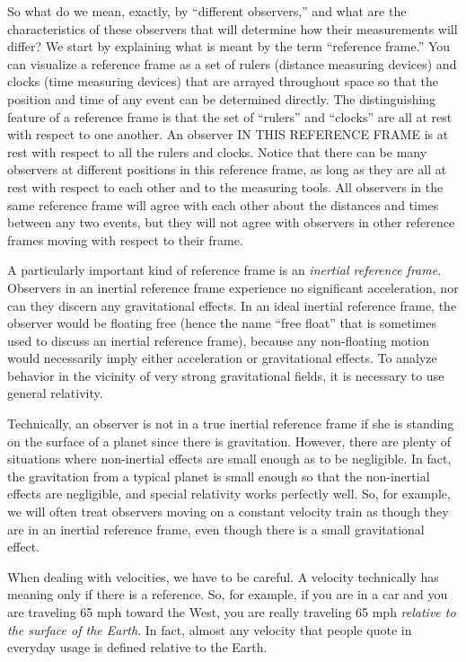    
So what do we mean, exactly, by ``different observers,'' and what
are the characteristics of these observers that will determine how
their measurements will differ?  We start by explaining what is meant
by the term ``reference frame.'' You can visualize a reference frame
as a set of rulers (distance measuring devices) and clocks (time
measuring devices) that are arrayed throughout space so that the
position and time of any event can be determined directly.  The distinguishing
feature of a reference frame is that the set of ``rulers'' and ``clocks''
are all at rest with respect to one another.  An observer IN THIS
REFERENCE FRAME is at rest with respect to all the rulers and clocks.
Notice that there can be many observers at different positions
in this reference frame, as long as they are all at rest with respect
to each other and to the measuring tools. All observers in the same
reference frame will agree with each other about the distances and
times between any two events, but they will not agree with observers
in other reference frames moving with respect to their frame.

A particularly important kind of reference frame is an \emph{inertial reference frame}.  Observers in an inertial reference
frame experience no significant acceleration, nor can they discern any
gravitational effects.  In an ideal inertial reference frame, the
observer would be floating free (hence the name ``free float'' that is
sometimes used to discuss an inertial reference frame), because any
non-floating motion would necessarily imply either acceleration or
gravitational effects.  To analyze behavior in the vicinity of very
strong gravitational fields, it is necessary to use general
relativity.
   
Technically, an observer is not in a true inertial reference frame if
she is standing on the surface of a planet since there is gravitation.
However, there are plenty of situations where non-inertial effects are
small enough as to be negligible.  In fact, the gravitation from a
typical planet is small enough so that the non-inertial effects are
negligible, and special relativity works perfectly well.  So, for
example, we will often treat observers moving on a constant velocity
train as though they are in an inertial reference frame, even though
there is a small gravitational effect.
   
When dealing with velocities, we have to be careful.  A velocity
technically has meaning only if there is a reference.  So, for
example, if you are in a car and you are traveling 65 mph toward the
West, you are really traveling 65 mph \emph{relative to the
surface of the Earth}.  In fact, almost any velocity that people
quote in everyday usage is defined relative to the Earth.
   
